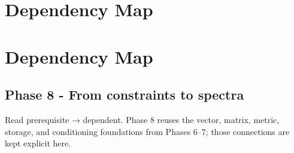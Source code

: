 \hypertarget{appendix-4ad47bdd269a}{}
\section*{Dependency Map}
\section{Dependency Map}\label{dependency-map}

\subsection{Phase 8 - From constraints to spectra}\label{phase-8---from-constraints-to-spectra}

Read prerequisite → dependent. Phase 8 reuses the vector, matrix, metric, storage, and conditioning foundations from Phases 6--7; those connections are kept explicit here.

